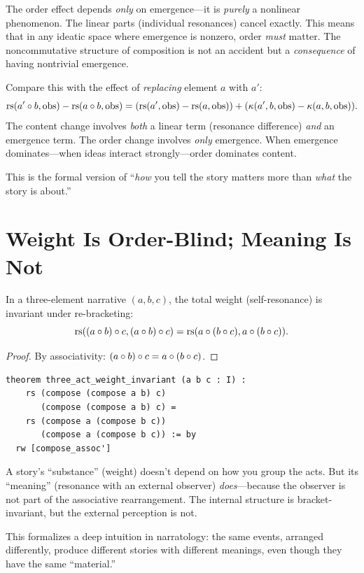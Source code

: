 \begin{remark}
The order effect depends \emph{only} on emergence---it is \emph{purely}
a nonlinear phenomenon.  The linear parts (individual resonances)
cancel exactly.  This means that in any ideatic space where emergence is
nonzero, order \emph{must} matter.  The noncommutative structure of
composition is not an accident but a \emph{consequence} of having
nontrivial emergence.

Compare this with the effect of \emph{replacing} element $a$ with $a'$:
\[
  \mathrm{rs}(a' \circ b, \mathrm{obs}) - \mathrm{rs}(a \circ b, \mathrm{obs})
  = (\mathrm{rs}(a', \mathrm{obs}) - \mathrm{rs}(a, \mathrm{obs}))
    + (\kappa(a', b, \mathrm{obs}) - \kappa(a, b, \mathrm{obs})).
\]
The content change involves \emph{both} a linear term (resonance difference)
\emph{and} an emergence term.  The order change involves \emph{only}
emergence.  When emergence dominates---when ideas interact strongly---order
dominates content.

This is the formal version of ``\emph{how} you tell the story matters
more than \emph{what} the story is about.''
\end{remark}

\section{Weight Is Order-Blind; Meaning Is Not}

\begin{theorem}
\label{thm:weight-invariance}
In a three-element narrative $(a, b, c)$, the total weight
(self-resonance) is invariant under re-bracketing:
\[
  \mathrm{rs}((a \circ b) \circ c, (a \circ b) \circ c)
  = \mathrm{rs}(a \circ (b \circ c), a \circ (b \circ c)).
\]
\end{theorem}

\begin{proof}
By associativity: $(a \circ b) \circ c = a \circ (b \circ c)$.
\end{proof}

\begin{lstlisting}
theorem three_act_weight_invariant (a b c : I) :
    rs (compose (compose a b) c)
       (compose (compose a b) c) =
    rs (compose a (compose b c))
       (compose a (compose b c)) := by
  rw [compose_assoc']
\end{lstlisting}

\begin{interpretation}
A story's ``substance'' (weight) doesn't depend on how you group
the acts.  But its ``meaning'' (resonance with an external observer)
\emph{does}---because the observer is not part of the associative
rearrangement.  The internal structure is bracket-invariant, but the
external perception is not.

This formalizes a deep intuition in narratology: the same events,
arranged differently, produce different stories with different meanings,
even though they have the same ``material.''
\end{interpretation}

